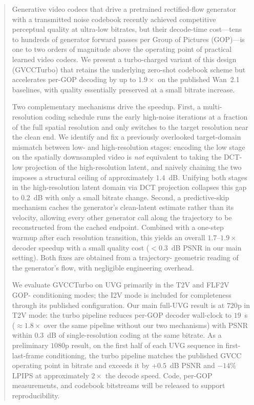 \begin{abstract}
Generative video codecs that drive a pretrained rectified-flow generator with
a transmitted noise codebook recently achieved competitive perceptual quality
at ultra-low bitrates, but their decode-time cost---tens to hundreds of
generator forward passes per Group of Pictures (GOP)---is one to two orders of
magnitude above the operating point of practical learned video codecs. We
present a turbo-charged variant of this design (GVCCTurbo) that retains the
underlying zero-shot codebook scheme but accelerates per-GOP decoding by up to
$1.9\times$ on the published Wan~2.1 baselines, with quality essentially
preserved at a small bitrate increase.

Two complementary mechanisms drive the speedup. First, a multi-resolution
coding schedule runs the early high-noise iterations at a fraction of the full
spatial resolution and only switches to the target resolution near the clean
end. We identify and fix a previously overlooked target-domain mismatch
between low- and high-resolution stages: encoding the low stage on the
spatially downsampled video is \emph{not} equivalent to taking the DCT-low
projection of the high-resolution latent, and naively chaining the two
imposes a structural ceiling of approximately $1.4$~dB. Unifying both stages
in the high-resolution latent domain via DCT projection collapses this gap to
$0.2$~dB with only a small bitrate change. Second, a predictive-skip mechanism
caches the generator's clean-latent estimate rather than its velocity, allowing every
other generator call along the trajectory to be reconstructed from the cached
endpoint. Combined with a one-step warmup after each resolution transition,
this yields an overall $1.7$--$1.9\times$ decoder speedup with a small
quality cost ($<0.3$~dB PSNR in our main setting). Both fixes are obtained from a trajectory-
geometric reading of the generator's flow, with negligible engineering
overhead.

We evaluate GVCCTurbo on UVG primarily in the T2V and FLF2V GOP-
conditioning modes; the I2V mode is included for completeness through
its published configuration. Our main full-UVG result is at $720$p in
T2V mode: the turbo pipeline reduces per-GOP decoder wall-clock to
$19$~s ($\approx 1.8\times$ over the same pipeline without our two
mechanisms) with PSNR within $0.3$~dB of single-resolution coding at
the same bitrate. As a preliminary $1080$p result, on the first half
of each UVG sequence in first-last-frame conditioning, the turbo
pipeline matches the published GVCC operating point in bitrate and
exceeds it by $+0.5$~dB PSNR and $-14\%$ LPIPS at approximately
$2\times$ the decode speed. Code, per-GOP measurements, and codebook
bitstreams will be released to support reproducibility.
\end{abstract}
